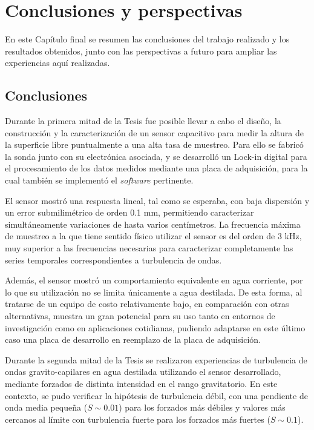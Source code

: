 \chapter{Conclusiones y perspectivas} 
\thispagestyle{plain} 
 
En este Capítulo final se resumen las conclusiones del trabajo realizado y los resultados obtenidos, junto con las perspectivas a futuro para ampliar las experiencias aquí realizadas. 


\section{Conclusiones}  

Durante la primera mitad de la Tesis fue posible llevar a cabo el diseño, la construcción y la caracterización de un sensor capacitivo para medir la altura de la superficie libre puntualmente a una alta tasa de muestreo. Para ello se fabricó la sonda junto con su electrónica asociada, y se  desarrolló un Lock-in digital para el procesamiento de los datos medidos mediante una placa de adquisición, para la cual también se implementó el \textit{software} pertinente. %

El sensor mostró una respuesta lineal, tal como se esperaba, con baja dispersión y un error submilimétrico de orden 0.1 mm, permitiendo caracterizar simultáneamente variaciones de hasta varios centímetros. La frecuencia máxima de muestreo a la que tiene sentido físico utilizar el sensor es del orden de 3 kHz, muy superior a las frecuencias necesarias para caracterizar completamente las series temporales correspondientes a turbulencia de ondas. %

Además, el sensor mostró un comportamiento equivalente en agua corriente, por lo que su utilización no se limita únicamente a agua destilada. De esta forma, al tratarse de un equipo de costo relativamente bajo, en comparación con otras alternativas, muestra un gran potencial para su uso tanto en entornos de investigación como en aplicaciones  cotidianas, pudiendo adaptarse en este último caso una placa de desarrollo en reemplazo de la placa de adquisición. %

Durante la segunda mitad de la Tesis se realizaron experiencias de turbulencia de ondas gravito-capilares en agua destilada utilizando el sensor desarrollado, mediante forzados de distinta intensidad en el rango gravitatorio.  En este contexto, se pudo verificar la hipótesis de turbulencia débil, con una pendiente de onda media pequeña ($S\sim0.01$) para los forzados más débiles y valores más cercanos al límite con turbulencia fuerte para los forzados más fuertes ($S\sim0.1$). %



